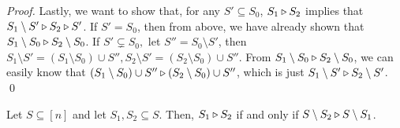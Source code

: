 \begin{proof}
Lastly, we want to show that, for any $S' \subseteq S_0$, $S_1 \triangleright S_2$ implies that $S_1 \setminus S' \triangleright S_2 \triangleright S'$. If $S' = S_0$, then from above, we have already shown that $S_1 \setminus S_0 \triangleright S_2 \setminus S_0$. If $S' \subsetneq S_0,$ let $S'' = S_0 \setminus S'$, then $S_1 \setminus S' = (S_1 \setminus S_0) \cup S'', S_2 \setminus S' = (S_2 \setminus S_0) \cup S''$. 
From $S_1 \setminus S_0 \triangleright S_2 \setminus S_0$, we can easily know that $(S_1 \setminus S_0) \cup S'' \triangleright (S_2 \setminus S_0) \cup S''$, which is just $S_1 \setminus S' \triangleright S_2 \setminus S'$. 
\qed \end{proof}



\begin{lemma}
\label{lem: domination_dual}
Let $S \subseteq [n]$ and let $S_1 ,S_2 \subseteq S$.
Then, $S_1\triangleright S_2$ if and only if $S \setminus S_2 \triangleright S \setminus S_1$. 
\end{lemma}

